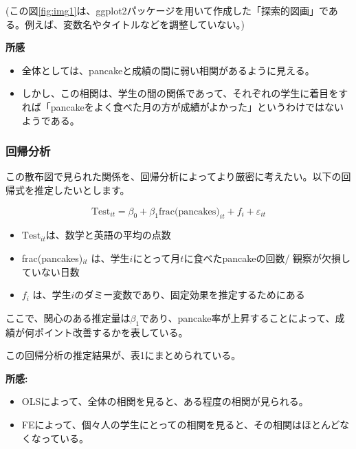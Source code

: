 \documentclass[xelatex,ja=standard]{bxjsarticle}
\begin{document}
(この図\ref{fig:img1}は、ggplot2パッケージを用いて作成した「探索的図画」である。例えば、変数名やタイトルなどを調整していない。)

\textbf{所感}
\begin{itemize}
\item 全体としては、pancakeと成績の間に弱い相関があるように見える。
\item しかし、この相関は、学生の間の関係であって、それぞれの学生に着目をすれば「pancakeをよく食べた月の方が成績がよかった」というわけではないようである。
\end{itemize}

\subsubsection{回帰分析}
この散布図で見られた関係を、回帰分析によってより厳密に考えたい。以下の回帰式を推定したいとします。

\begin{equation}
\text{Test}_{it} = \beta_0 + \beta_{1} \text{frac(pancakes)}_{it} + f_{i} + \varepsilon_{it}
\end{equation}

\begin{itemize}
\item $\text{Test}_{it}$は、数学と英語の平均の点数
\item frac(pancakes)$_{it}$ は、学生$i$にとって月$t$に食べたpancakeの回数/ 観察が欠損していない日数
\item $f_i$ は、学生$i$のダミー変数であり、固定効果を推定するためにある
\end{itemize}

ここで、関心のある推定量は$\beta_{1}$であり、pancake率が上昇することによって、成績が何ポイント改善するかを表している。



この回帰分析の推定結果が、表1にまとめられている。

\vspace

\textbf{所感:}
\begin{itemize}
\item OLSによって、全体の相関を見ると、ある程度の相関が見られる。
\item FEによって、個々人の学生にとっての相関を見ると、その相関はほとんどなくなっている。
\end{itemize}
\end{document}
